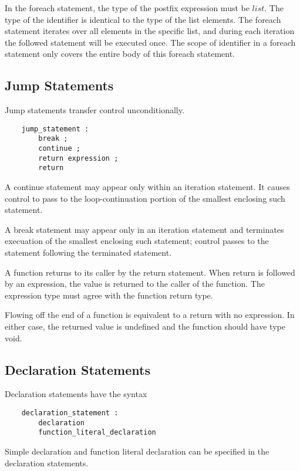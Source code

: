 \documentclass[letterpaper,12pt]{article}
\begin{document}
In the foreach statement, the type of the postfix expression must be $list$. The type of the identifier is identical to the type of the list elements. The foreach statement iterates over all elements in the specific list, and during each iteration the followed statement will be executed once. The scope of identifier in a foreach statement only covers the entire body of this foreach statement.

\subsection{Jump Statements}
Jump statements transfer control unconditionally.
\begin{lstlisting}
	jump_statement :
		break ;
		continue ;
		return expression ;
		return
\end{lstlisting}
 A continue statement may appear only within an iteration statement. It causes control to pass to the loop-continuation portion of the smallest enclosing such statement.\newline

A break statement may appear only in an iteration statement and terminates execuation of the smallest enclosing such statement; control passes to the statement following the terminated statement. \newline

A function returns to its caller by the return statement. When return is followed by an expression, the value is returned to the caller of the function. The expression type must agree with the function return type. \newline

 Flowing off the end of a function is equivalent to a return with no expression. In either case, the returned value is undefined and the function should have type void. \newline

\subsection{Declaration Statements}
Declaration statements have the syntax
\begin{lstlisting}
	declaration_statement :
		declaration
		function_literal_declaration
\end{lstlisting}
Simple declaration and function literal declaration can be specified in the declaration statements.  
\end{document}
